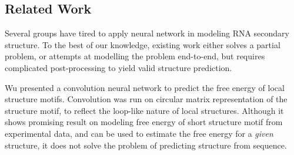 \documentclass{article}
\begin{document}




\subsection{Related Work}

Several groups have tired to apply neural network in modeling RNA secondary structure.
To the best of our knowledge, existing work either solves a partial problem,
or attempts at modelling the problem end-to-end,
but requires complicated post-processing to yield valid structure prediction.

Wu\cite{wu2018convolutional} presented a convolution neural network to predict the free energy of local structure motifs.
Convolution was run on circular matrix representation of the structure motif, to reflect the loop-like nature of local structures.
Although it shows promising result on modeling free energy of short structure motif from experimental data,
and can be used to estimate the free energy for a \textit{given} structure,
it does not solve the problem of predicting structure from sequence.
\end{document}
